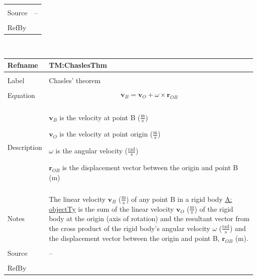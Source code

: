 \documentclass[12pt]{article}
\begin{document}
\begin{minipage}{\textwidth}
\begin{tabular}{>{\raggedright}p{}>{\raggedright\arraybackslash}p{}}
          \\ \midrule \\
          Source & --
          \\ \midrule \\
          RefBy & 
          \\ \bottomrule
          \end{tabular}
          \end{minipage}
\par~

\noindent \begin{minipage}{\textwidth}
          \begin{tabular}{>{\raggedright}p{}>{\raggedright\arraybackslash}p{}}
          \toprule \textbf{Refname} & \textbf{TM:ChaslesThm}
          \label{TM:ChaslesThm}
          \\ \midrule \\
          Label & Chasles' theorem
          \\ \midrule \\
          Equation & \begin{displaymath}
                     {\mathbf{v}_{B}}={\mathbf{v}_{O}}+ω\times{\mathbf{r}_{OB}}
                     \end{displaymath}
          \\ \midrule \\
          Description & \begin{symbDescription}
                        \item{${\mathbf{v}_{B}}$ is the velocity at point B ($\frac{\text{m}}{\text{s}}$)}
                        \item{${\mathbf{v}_{O}}$ is the velocity at point origin ($\frac{\text{m}}{\text{s}}$)}
                        \item{$ω$ is the angular velocity ($\frac{\text{rad}}{\text{s}}$)}
                        \item{${\mathbf{r}_{OB}}$ is the displacement vector between the origin and point B (m)}
                        \end{symbDescription}
          \\ \midrule \\
          Notes & The linear velocity ${\mathbf{v}_{B}}$ ($\frac{\text{m}}{\text{s}}$) of any point B in a rigid body \hyperref[assumpOT]{A: objectTy} is the sum of the linear velocity ${\mathbf{v}_{O}}$ ($\frac{\text{m}}{\text{s}}$) of the rigid body at the origin (axis of rotation) and the resultant vector from the cross product of the rigid body's angular velocity $ω$ ($\frac{\text{rad}}{\text{s}}$) and the displacement vector between the origin and point B, ${\mathbf{r}_{OB}}$ (m).
          \\ \midrule \\
          Source & --
          \\ \midrule \\
          RefBy & 
          \\ \bottomrule
          \end{tabular}
          \end{minipage}
\end{document}
